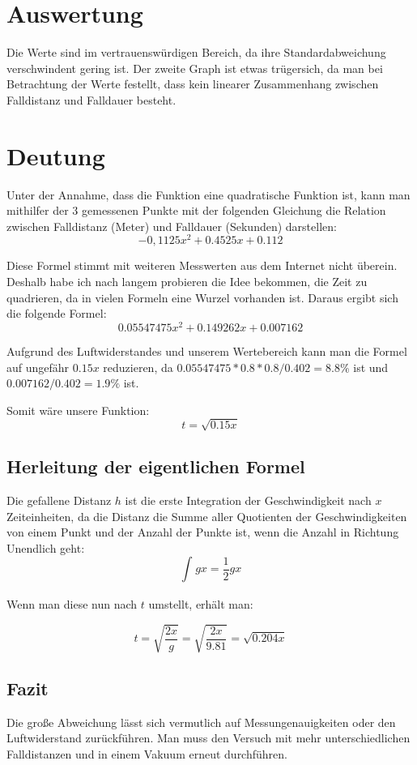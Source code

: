 \documentclass[8pt, letterpaper]{article}
\begin{document}

\section{Auswertung}
Die Werte sind im vertrauenswürdigen Bereich, da ihre Standardabweichung verschwindent gering ist.
Der zweite Graph ist etwas trügersich, da man bei Betrachtung der Werte festellt, dass kein linearer Zusammenhang zwischen Falldistanz und Falldauer besteht.

\section{Deutung}
Unter der Annahme, dass die Funktion eine quadratische Funktion ist, kann man mithilfer der 3 gemessenen Punkte mit der folgenden Gleichung die Relation zwischen Falldistanz (Meter) und Falldauer (Sekunden) darstellen:
\[ -0,1125x^{2} + 0.4525x + 0.112 \]

Diese Formel stimmt mit weiteren Messwerten aus dem Internet nicht überein. Deshalb habe ich nach langem probieren die Idee bekommen, die Zeit zu quadrieren, da in vielen Formeln eine Wurzel vorhanden ist. Daraus ergibt sich die folgende Formel:
\[ 0.05547475x^{2} + 0.149262x + 0.007162 \]

Aufgrund des Luftwiderstandes und unserem Wertebereich kann man die Formel auf ungefähr $0.15x$ reduzieren, da $0.05547475 * 0.8 * 0.8 / 0.402 = 8.8\%$ ist und $0.007162 / 0.402 = 1.9\%$ ist.

Somit wäre unsere Funktion:
\[ t = \sqrt{0.15x} \]

\subsection{Herleitung der eigentlichen Formel}
Die gefallene Distanz $h$ ist die erste Integration der Geschwindigkeit nach $x$ Zeiteinheiten, da die Distanz die Summe aller Quotienten der Geschwindigkeiten von einem Punkt und der Anzahl der Punkte ist, wenn die Anzahl in Richtung Unendlich geht:
\[ \int_{}^{}gx=\frac{1}{2}gx \]

Wenn man diese nun nach $t$ umstellt, erhält man:

\[ t = \sqrt{\frac{2x}{g}} = \sqrt{\frac{2x}{9.81}} = \sqrt{0.204x} \]

\subsection{Fazit}
Die große Abweichung lässt sich vermutlich auf Messungenauigkeiten oder den Luftwiderstand zurückführen. Man muss den Versuch mit mehr unterschiedlichen Falldistanzen und in einem Vakuum erneut durchführen.

% 
\end{document}
